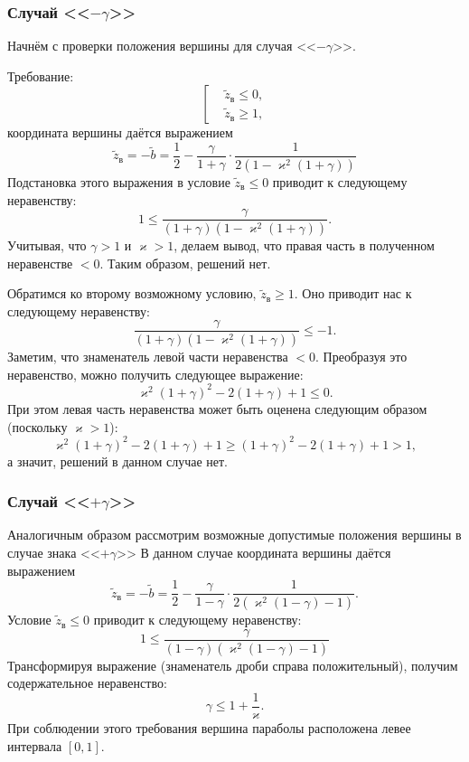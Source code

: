 \documentclass[a4paper, 12pt]{extarticle}
\def \vk {\varkappa}
\def \tz {\tilde{z}}
\def \tb {\tilde{b}}
\begin{document}
\subsubsection{Случай <<$-\gamma$>>}
Начнём с проверки положения вершины для случая <<$-\gamma$>>. 

Требование:
$$
\left[
\begin{aligned}
	&\tz_\text{в} \leqslant 0,\\
	&\tz_\text{в} \geqslant 1,
\end{aligned}
\right.
$$
координата вершины даётся выражением
$$
\tz_\text{в} = -\tb = \frac{1}{2} - \frac{\gamma}{1 + \gamma}\cdot\frac{1}{2\left( 1 - \vk^2(1 + \gamma) \right)}
$$
Подстановка этого выражения в условие $\tz_\text{в}\leqslant 0$ приводит к следующему неравенству:
\begin{equation}
	1 \leqslant \frac{\gamma}{(1+\gamma)(1-\vk^2(1+\gamma))}.
\end{equation}
Учитывая, что $\gamma > 1$ и $\vk > 1$, делаем вывод, что правая часть в полученном неравенстве $<0$.
Таким образом, решений нет.

Обратимся ко второму возможному условию, $\tz_\text{в} \geqslant 1$.
Оно приводит нас к следующему неравенству:
$$
\frac{\gamma}{(1+\gamma)(1 - \vk^2(1+\gamma))} \leqslant -1.
$$
Заметим, что знаменатель левой части неравенства $< 0$.
Преобразуя это неравенство, можно получить следующее выражение:
$$
\vk^2(1+\gamma)^2 - 2(1+\gamma) + 1 \leqslant 0.
$$
При этом левая часть неравенства может быть оценена следующим образом (поскольку $\vk > 1$):
$$
\vk^2(1+\gamma)^2 - 2(1+\gamma) + 1 \geqslant (1+\gamma)^2 - 2(1+\gamma) + 1 > 1,
$$
а значит, решений в данном случае нет.

\subsubsection{Случай <<$+\gamma$>>}
Аналогичным образом рассмотрим возможные допустимые положения вершины в случае знака <<$+\gamma$>>
В данном случае координата вершины даётся выражением
$$
\tz_\text{в} = -\tb = \frac{1}{2} - \frac{\gamma}{1 - \gamma}\cdot\frac{1}{2\left( \vk^2(1 - \gamma) -1 \right)}.
$$
Условие $\tz_\text{в} \leqslant 0$ приводит к следующему неравенству:
$$
1 \leqslant \frac{\gamma}{(1-\gamma)(\vk^2(1-\gamma)-1)}
$$
Трансформируя выражение (знаменатель дроби справа положительный), получим содержательное неравенство:
\begin{equation}\label{eq:condition_plusgamma_correct_align}
	\gamma \leqslant 1 + \frac{1}{\vk}.
\end{equation}
При соблюдении этого требования вершина параболы расположена левее интервала $[0, 1]$. 
\end{document}
